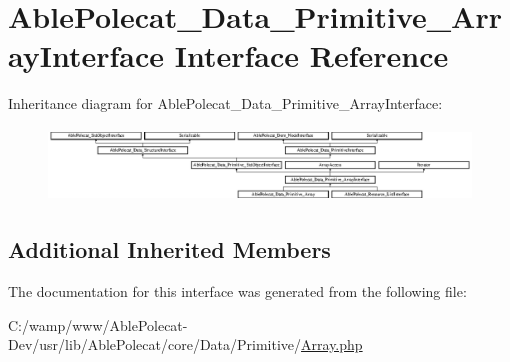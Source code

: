 \hypertarget{interface_able_polecat___data___primitive___array_interface}{}\section{Able\+Polecat\+\_\+\+Data\+\_\+\+Primitive\+\_\+\+Array\+Interface Interface Reference}
\label{interface_able_polecat___data___primitive___array_interface}
Inheritance diagram for Able\+Polecat\+\_\+\+Data\+\_\+\+Primitive\+\_\+\+Array\+Interface\+:\begin{figure}[H]
\begin{center}
\leavevmode
\includegraphics[height=1.944444cm]{interface_able_polecat___data___primitive___array_interface}
\end{center}
\end{figure}
\subsection*{Additional Inherited Members}


The documentation for this interface was generated from the following file\+:\begin{DoxyCompactItemize}
\item 
C\+:/wamp/www/\+Able\+Polecat-\/\+Dev/usr/lib/\+Able\+Polecat/core/\+Data/\+Primitive/\hyperlink{_array_8php}{Array.\+php}\end{DoxyCompactItemize}
